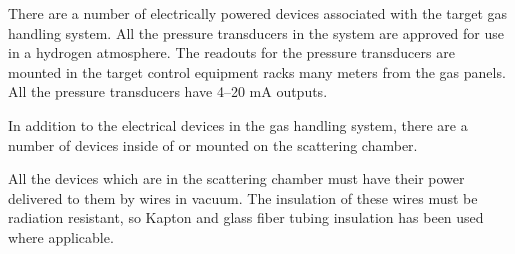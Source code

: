 \begin{safetyen}{0}{0}
{There are a number of electrically powered devices associated with
the target gas handling system. All the pressure transducers in the
system are approved for use in a hydrogen atmosphere. 
The readouts for the pressure transducers are mounted in the target
control equipment racks many meters from the gas panels. All the pressure
transducers have 4--20 mA outputs.

In addition to the electrical devices in the gas handling system,
there are a number of devices inside of or mounted on the scattering
chamber.

All the devices which are in the scattering chamber must have their
power delivered to them by wires in vacuum. The insulation of these
wires must be radiation resistant, so Kapton and glass fiber tubing
insulation has been used where applicable.

}
\end{safetyen}
